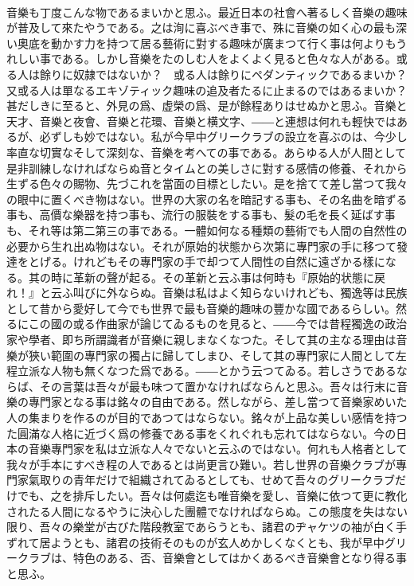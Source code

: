 \documentclass[8pt]{extreport}
\begin{document}
\begin{CJK}{UTF8}{min}
\\	音樂も丁度こんな物であるまいかと思ふ。最近日本の社會へ著るしく音樂の趣味が普及して來たやうである。之は洵に喜ぶべき事で、殊に音樂の如く心の最も深い奧底を動かす力を持つて居る藝術に對する趣味が廣まつて行く事は何よりもうれしい事である。しかし音樂をたのしむ人をよくよく見ると色々な人がある。或る人は餘りに奴隷ではないか？　或る人は餘りにペダンティックであるまいか？　又或る人は單なるエキゾティック趣味の追及者たるに止まるのではあるまいか？　甚だしきに至ると、外見の爲、虚榮の爲、是が餘程ありはせぬかと思ふ。音樂と天才、音樂と夜會、音樂と花環、音樂と横文字、――と連想は何れも輕快ではあるが、必ずしも妙ではない。私が今早中グリークラブの設立を喜ぶのは、今少し率直な切實なそして深刻な、音樂を考へての事である。あらゆる人が人間として是非訓練しなければならぬ音とタイムとの美しさに對する感情の修養、それから生ずる色々の賜物、先づこれを當面の目標としたい。是を捨てて差し當つて我々の眼中に置くべき物はない。世界の大家の名を暗記する事も、その名曲を暗ずる事も、高價な樂器を持つ事も、流行の服裝をする事も、髮の毛を長く延ばす事も、それ等は第二第三の事である。一體如何なる種類の藝術でも人間の自然性の必要から生れ出ぬ物はない。それが原始的状態から次第に專門家の手に移つて發達をとげる。けれどもその專門家の手で却つて人間性の自然に遠ざかる樣になる。其の時に革新の聲が起る。その革新と云ふ事は何時も『原始的状態に戻れ！』と云ふ叫びに外ならぬ。音樂は私はよく知らないけれども、獨逸等は民族として昔から愛好して今でも世界で最も音樂的趣味の豐かな國であるらしい。然るにこの國の或る作曲家が論じてゐるものを見ると、――今では昔程獨逸の政治家や學者、即ち所謂識者が音樂に親しまなくなつた。そして其の主なる理由は音樂が狹い範圍の專門家の獨占に歸してしまひ、そして其の專門家に人間として左程立派な人物も無くなつた爲である。――とかう云つてゐる。若しさうであるならば、その言葉は吾々が最も味つて置かなければならんと思ふ。吾々は行末に音樂の專門家となる事は銘々の自由である。然しながら、差し當つて音樂家めいた人の集まりを作るのが目的であつてはならない。銘々が上品な美しい感情を持つた圓滿な人格に近づく爲の修養である事をくれぐれも忘れてはならない。今の日本の音樂專門家を私は立派な人々でないと云ふのではない。何れも人格者として我々が手本にすべき程の人であるとは尚更言ひ難い。若し世界の音樂クラブが專門家氣取りの青年だけで組織されてゐるとしても、せめて吾々のグリークラブだけでも、之を排斥したい。吾々は何處迄も唯音樂を愛し、音樂に依つて更に教化されたる人間になるやうに決心した團體でなければならぬ。この態度を失はない限り、吾々の樂堂が古びた階段教室であらうとも、諸君のヂャケツの袖が白く手ずれて居ようとも、諸君の技術そのものが玄人めかしくなくとも、我が早中グリークラブは、特色のある、否、音樂會としてはかくあるべき音樂會となり得る事と思ふ。

\end{CJK}
\end{document}
